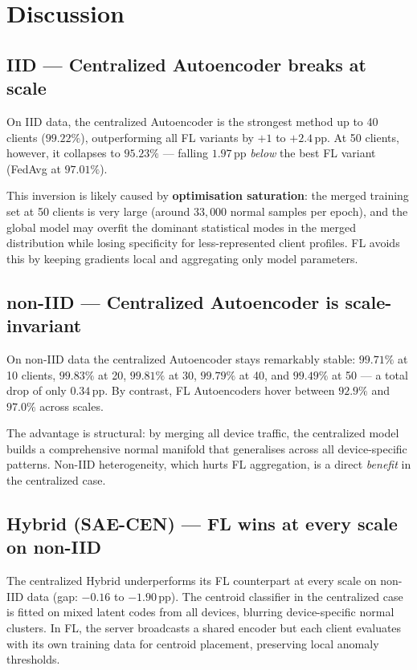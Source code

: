 \documentclass[11pt,a4paper]{article}
\begin{document}
\newpage
\section{Discussion}

\subsection{IID — Centralized Autoencoder breaks at scale}

On IID data, the centralized Autoencoder is the strongest method up to 40 clients
($99.22\%$), outperforming all FL variants by $+1$ to $+2.4$\,pp.
At 50 clients, however, it collapses to $95.23\%$ — falling $1.97$\,pp
\emph{below} the best FL variant (FedAvg at $97.01\%$).

This inversion is likely caused by \textbf{optimisation saturation}: the merged
training set at 50 clients is very large (around $33{,}000$ normal samples per
epoch), and the global model may overfit the dominant statistical modes in the
merged distribution while losing specificity for less-represented client profiles.
FL avoids this by keeping gradients local and aggregating only model parameters.

\subsection{non-IID — Centralized Autoencoder is scale-invariant}

On non-IID data the centralized Autoencoder stays remarkably stable: $99.71\%$ at
10 clients, $99.83\%$ at 20, $99.81\%$ at 30, $99.79\%$ at 40, and $99.49\%$ at
50 — a total drop of only $0.34$\,pp.  By contrast, FL Autoencoders hover between
$92.9\%$ and $97.0\%$ across scales.

The advantage is structural: by merging all device traffic, the centralized model
builds a comprehensive normal manifold that generalises across all device-specific
patterns.  Non-IID heterogeneity, which hurts FL aggregation, is a direct
\emph{benefit} in the centralized case.

\subsection{Hybrid (SAE-CEN) — FL wins at every scale on non-IID}

The centralized Hybrid underperforms its FL counterpart at every scale on non-IID
data (gap: $-0.16$ to $-1.90$\,pp).  The centroid classifier in the centralized
case is fitted on mixed latent codes from all devices, blurring device-specific
normal clusters.  In FL, the server broadcasts a shared encoder but each client
evaluates with its own training data for centroid placement, preserving local
anomaly thresholds.
\end{document}
